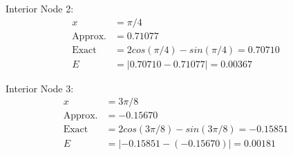 		Interior Node 2:
		\begin{align}
				x &= \pi/4& \\
				\text{Approx.} &= 0.71077& \\
				\text{Exact} &= 2cos(\pi/4) - sin(\pi/4) = 0.70710& \\
				E &= |0.70710-0.71077| = 0.00367
		\end{align}

		Interior Node 3:
		\begin{align}
				x &= 3\pi/8& \\
				\text{Approx.} &= -0.15670& \\
				\text{Exact} &= 2cos(3\pi/8) - sin(3\pi/8) = -0.15851& \\
				E &= |-0.15851-(-0.15670)| = 0.00181
		\end{align}
